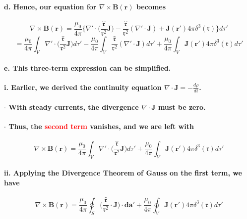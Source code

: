 \documentclass{article}
\begin{document}
\paragraph{\indent d. Hence, our equation for $\nabla\times\boldsymbol{B}(\boldsymbol{r})$ becomes}
\begin{equation*}
    \nabla\times\boldsymbol{B}(\boldsymbol{r})=\frac{\mu_0}{4\pi}\bigg\{ \nabla'\cdot\bigg(\frac{\hat{\boldsymbol{\mathfrak{r}}}}{\mathfrak{r}^2}\boldsymbol{J}\bigg)-\frac{\hat{\boldsymbol{\mathfrak{r}}}}{\mathfrak{r}^2}(\nabla'\cdot\boldsymbol{J})+\boldsymbol{J}(\boldsymbol{r}')4\pi\delta^3(\boldsymbol{\mathfrak{r}})\bigg\}d\tau'
\end{equation*}
\begin{equation*}
    =\frac{\mu_0}{4\pi}\int_V\nabla'\cdot\bigg(\frac{\hat{\boldsymbol{\mathfrak{r}}}}{\mathfrak{r}^2}\boldsymbol{J}\bigg)d\tau'-\frac{\mu_0}{4\pi}\int_V\frac{\hat{\boldsymbol{\mathfrak{r}}}}{\mathfrak{r}^2}(\nabla'\cdot\boldsymbol{J})d\tau'+\frac{\mu_0}{4\pi}\int_V\boldsymbol{J}(\boldsymbol{r}')4\pi\delta^3(\boldsymbol{\mathfrak{r}})d\tau'
\end{equation*}
\paragraph{\indent e. This three-term expression can be simplified.}
\paragraph{\indent\indent i. Earlier, we derived the continuity equation $\nabla\cdot\boldsymbol{J}=-\frac{d\rho}{dt}$.}
\paragraph{\indent\indent $\cdot$ With steady currents, the divergence $\nabla\cdot\boldsymbol{J}$ must be zero.}
\paragraph{\indent\indent $\cdot$ Thus, the \textcolor{red}{second term} vanishes, and we are left with}
\begin{equation*}
    \nabla\times\boldsymbol{B}(\boldsymbol{r})=\frac{\mu_0}{4\pi}\int_V\nabla'\cdot\bigg(\frac{\hat{\boldsymbol{\mathfrak{r}}}}{\mathfrak{r}^2}\boldsymbol{J}\bigg)d\tau'+\frac{\mu_0}{4\pi}\int_V\boldsymbol{J}(\boldsymbol{r}')4\pi\delta^3(\boldsymbol{\mathfrak{r}})d\tau'
\end{equation*}
\paragraph{\indent\indent ii. Applying the Divergence Theorem of Gauss on the first term, we have}
\begin{equation*}
    \nabla\times\boldsymbol{B}(\boldsymbol{r})=\frac{\mu_0}{4\pi}\oint_S\bigg(\frac{\hat{\boldsymbol{\mathfrak{r}}}}{\mathfrak{r}^2}\cdot\boldsymbol{J}\bigg)\cdot\boldsymbol{da}'+\frac{\mu_0}{4\pi}\oint_V \boldsymbol{J}(\boldsymbol{r}')4\pi\delta^3(\boldsymbol{\mathfrak{r}})d\tau'
\end{equation*}
\end{document}
